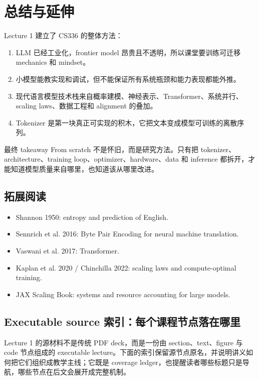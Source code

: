 \section{总结与延伸}

Lecture 1 建立了 CS336 的整体方法：

\begin{enumerate}
    \item LLM 已经工业化，frontier model 昂贵且不透明，所以课堂要训练可迁移 mechanics 和 mindset。
    \item 小模型能教实现和调试，但不能保证所有系统瓶颈和能力表现都能外推。
    \item 现代语言模型技术栈来自概率建模、神经表示、Transformer、系统并行、scaling laws、数据工程和 alignment 的叠加。
    \item Tokenizer 是第一块真正可实现的积木，它把文本变成模型可训练的离散序列。
\end{enumerate}

\begin{importantbox}{最终 takeaway}
From scratch 不是怀旧，而是研究方法。只有把 tokenizer、architecture、training loop、optimizer、hardware、data 和 inference 都拆开，才能知道模型质量来自哪里，也知道该从哪里改进。
\end{importantbox}

\subsection{拓展阅读}

\begin{itemize}
    \item Shannon 1950: entropy and prediction of English.
    \item Sennrich et al. 2016: Byte Pair Encoding for neural machine translation.
    \item Vaswani et al. 2017: Transformer.
    \item Kaplan et al. 2020 / Chinchilla 2022: scaling laws and compute-optimal training.
    \item JAX Scaling Book: systems and resource accounting for large models.
\end{itemize}

\subsection{Executable source 索引：每个课程节点落在哪里}

Lecture 1 的源材料不是传统 PDF deck，而是一份由 section、text、figure 与 code 节点组成的 executable lecture。下面的索引保留源节点原名，并说明讲义如何把它们组织成教学主线；它既是 coverage ledger，也提醒读者哪些标题只是导航，哪些节点在后文会展开成完整机制。

